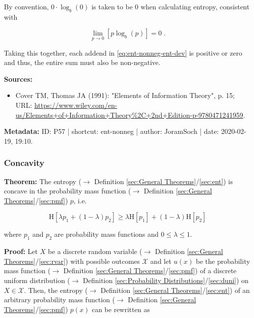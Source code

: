 \documentclass[a4paper,12pt,twoside]{book}
\begin{document}
By convention, $0 \cdot \log_b(0)$ is taken to be $0$ when calculating entropy, consistent with

\begin{equation} \label{eq:ent-nonneg-lim-0log0}
\lim_{p \to 0} \left[ p \log_b(p) \right] = 0 \; .
\end{equation}

Taking this together, each addend in \eqref{eq:ent-nonneg-ent-dev} is positive or zero and thus, the entire sum must also be non-negative.


\vspace{1em}
\textbf{Sources:}
\begin{itemize}
\item Cover TM, Thomas JA (1991): "Elements of Information Theory", p. 15; URL: \url{https://www.wiley.com/en-us/Elements+of+Information+Theory%2C+2nd+Edition-p-9780471241959}.
\end{itemize}


\vspace{1em}
\textbf{Metadata:} ID: P57 | shortcut: ent-nonneg | author: JoramSoch | date: 2020-02-19, 19:10.
\vspace{1em}



\subsubsection[\textbf{Concavity}]{Concavity} \label{sec:ent-conc}
\setcounter{equation}{0}

\textbf{Theorem:} The entropy ($\rightarrow$ Definition \ref{sec:General Theorems}/\ref{sec:ent}) is concave in the probability mass function ($\rightarrow$ Definition \ref{sec:General Theorems}/\ref{sec:pmf}) $p$, i.e.

\begin{equation} \label{eq:ent-conc-ent-conc}
\mathrm{H}[\lambda p_1 + (1-\lambda) p_2] \geq \lambda \mathrm{H}[p_1] + (1-\lambda) \mathrm{H}[p_2]
\end{equation}

where $p_1$ and $p_2$ are probability mass functions and $0 \leq \lambda \leq 1$.


\vspace{1em}
\textbf{Proof:} Let $X$ be a discrete random variable ($\rightarrow$ Definition \ref{sec:General Theorems}/\ref{sec:rvar}) with possible outcomes $\mathcal{X}$ and let $u(x)$ be the probability mass function ($\rightarrow$ Definition \ref{sec:General Theorems}/\ref{sec:pmf}) of a discrete uniform distribution ($\rightarrow$ Definition \ref{sec:Probability Distributions}/\ref{sec:duni}) on $X \in \mathcal{X}$. Then, the entropy ($\rightarrow$ Definition \ref{sec:General Theorems}/\ref{sec:ent}) of an arbitrary probability mass function ($\rightarrow$ Definition \ref{sec:General Theorems}/\ref{sec:pmf}) $p(x)$ can be rewritten as
\end{document}
